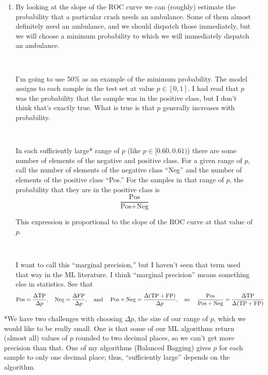 \begin{enumerate}
	\
	
	\item By looking at the slope of the ROC curve we can (roughly) estimate the probability that a particular crash needs an ambulance.  Some of them almost definitely need an ambulance, and we should dispatch those immediately, but we will choose a minimum probability to which we will immediately dispatch an ambulance.  
	
	\
	
	I'm going to use 50\% as an example of the minimum probability.  The model assigns to each sample in the test set at value $p \in [0,1]$.  I had read that $p$ was the probability that the sample was in the positive class, but I don't think that's exactly true.  What is true is that $p$ generally increases with probability.  
	
	\
	
	In each sufficiently large* range of $p$ (like $p \in [0.60, 0.61)$) there are some number of elements of the negative and positive class.  For a given range of $p$, call the number of elements of the negative class ``Neg'' and the number of elements of the positive class ``Pos.''  For the samples in that range of $p$, the probability that they are in the positive class is 
	$$ \frac{\text{Pos}}{ \text{Pos} + \text{Neg}}$$
	
This expression is proportional to the slope of the ROC curve at that value of $p$. 
	
	\
	
	I want to call this ``marginal precision,'' but I haven't seen that term used that way in the ML literature.  I think ``marginal precision'' means something else in statistics.   See that 
	$$\text{Pos} = \frac{\Delta \text{TP}}{\Delta p}, \quad 
	 \text{Neg} = \frac{\Delta \text{FP}}{\Delta p}, \text{\quad and \quad} 
	 \text{Pos} + \text{Neg} = \frac{\Delta (\text{TP} + \text{FP})}{
\Delta p}, \text{\quad so \quad}
	\frac{\text{Pos}}{ \text{Pos} + \text{Neg}} = \frac{\Delta \text{TP}}{\Delta(\text{TP} + \text{FP})}
	$$

\end{enumerate}
	
	*We have two challenges with choosing $\Delta p$, the size of our range of $p$, which we would like to be really small.  One is that some of our ML algorithms return (almost all) values of $p$ rounded to two decimal places, so we can't get more precision than that.  One of my algorithms (Balanced Bagging) gives $p$ for each sample to only one decimal place; thus, ``sufficiently large'' depends on the algorithm.  
	
